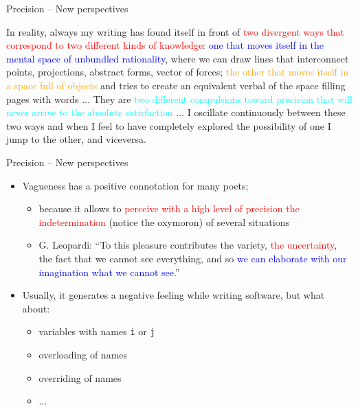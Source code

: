 \documentclass{beamer}
\begin{document}
\begin{frame}
{\centerline{Precision -- New perspectives}}
\begin{tcolorbox}[fonttitle=\bfseries,nobeforeafter,center title,colback=yellow!5,colframe=yellow!40!black,title=Impossibility to Generalize]
In reality, always my writing has found itself in front of \textcolor{red}{two divergent ways that correspond to two different kinds of knowledge}: \textcolor{blue}{one that moves itself in the mental space of unbundled rationality}, where we can draw lines that interconnect points, projections, abstract forms, vector of forces; \textcolor{orange}{the other that moves itself in a space full of objects} and tries to create an equivalent verbal of the space filling pages with words $\ldots{}$ They are \textcolor{cyan}{two different compulsions toward precision that will never arrive to the absolute satisfaction} $\ldots{}$ I oscillate continuously between these two ways and when I feel to have completely explored the possibility of one I jump to the other, and viceversa. 
\end{tcolorbox}

\end{frame}

\begin{frame}
{\centerline{Precision -- New perspectives}}
\begin{itemize}
\item Vagueness has a  positive connotation for many poets;
\begin{itemize}
\item because it allows to \textcolor{red}{perceive with a high level of precision} \textcolor{red}{the indetermination} (notice the oxymoron)  of several situations
\item G. Leopardi: ``To this pleasure contributes the variety,  \textcolor{red}{the uncertainty}, the fact that we cannot see everything, and so  \textcolor{blue}{we can elaborate with our imagination what we cannot see}.''
\end{itemize}
\item Usually, it generates a negative feeling while writing software, but what about:
\begin{itemize}
\item variables with names \texttt{i} or \texttt{j}
\item overloading of names
\item overriding of names
\item $\ldots{}$
\end{itemize}
\end{itemize}

\end{frame}
\end{document}
